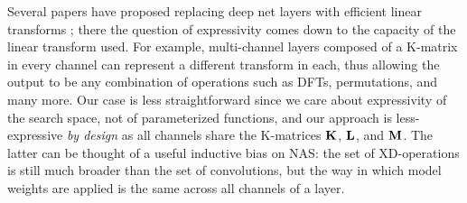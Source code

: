 
Several papers have proposed replacing deep net layers with efficient linear transforms \cite{moczulski2015acdc,dao2020kaleidoscope};
there the question of expressivity comes down to the capacity of the linear transform used.
For example, multi-channel layers composed of a K-matrix in every channel can represent a different transform in each, thus allowing the output to be any combination of operations such as DFTs, permutations, and many more.
Our case is less straightforward since we care about expressivity of the search space, not of parameterized functions, and our approach is less-expressive {\em by design} as all channels share the K-matrices $\mathbf{K}$, $\mathbf{L}$, and $\mathbf{M}$.
The latter can be thought of a useful inductive bias on NAS:
the set of XD-operations is still much broader than the set of convolutions, but the way in which model weights are applied is the same across all channels of a layer.

